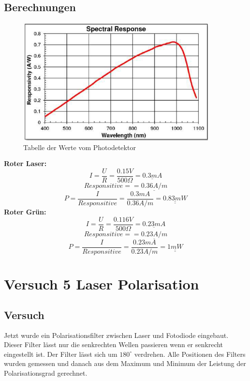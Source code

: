 \documentclass{article}
\begin{document}
 \subsection{Berechnungen}
 \begin{figure}[H]
 	\centering
 	\includegraphics[width=0.9\textwidth]{SR}
 	\caption{Tabelle der Werte vom Photodetektor}
 \end{figure}
\newpage
\textbf{Roter Laser:}
\begin{equation}
I = \frac{U}{R}=\frac{0.15V}{500\Omega}= \underline{0.3mA} 
\end{equation}
\begin{equation}
Responsitive = = \underline{0.36A/m}
\end{equation}
\begin{equation}
P = \frac{I}{Responsitive}= \frac{0.3mA}{0.36A/m}= \underline{\underline{0.83mW}}
\end{equation}
\textbf{Roter Grün:}
\begin{equation}
I = \frac{U}{R}=\frac{0.116V}{500\Omega}= \underline{0.23mA} 
\end{equation}
\begin{equation}
Responsitive = = \underline{0.23A/m}
\end{equation}
\begin{equation}
P = \frac{I}{Responsitive}= \frac{0.23mA}{0.23A/m}= \underline{\underline{1mW}}
\end{equation}
\newpage
\section{Versuch 5 Laser Polarisation}
\subsection{Versuch}
Jetzt wurde ein Polarisationsfilter zwischen Laser und Fotodiode eingebaut. Dieser Filter lässt nur die
senkrechten Wellen passieren wenn er senkrecht eingestellt ist. Der Filter lässt sich um $180^\circ$ verdrehen.
Alle Positionen des Filters wurden gemessen und danach aus dem Maximum und Minimum der
Leistung der Polarisationsgrad gerechnet.
\end{document}
